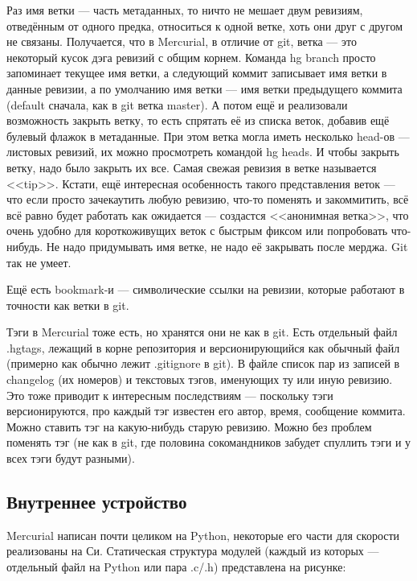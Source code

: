 \documentclass{../../text-style}
\begin{document}
Раз имя ветки --- часть метаданных, то ничто не мешает двум ревизиям, отведённым от одного предка, относиться к одной ветке, хоть они друг с другом не связаны. Получается, что в Mercurial, в отличие от git, ветка --- это некоторый кусок дэга ревизий с общим корнем. Команда hg branch просто запоминает текущее имя ветки, а следующий коммит записывает имя ветки в данные ревизии, а по умолчанию имя ветки --- имя ветки предыдущего коммита (default сначала, как в git ветка master). А потом ещё и реализовали возможность закрыть ветку, то есть спрятать её из списка веток, добавив ещё булевый флажок в метаданные. При этом ветка могла иметь несколько head-ов --- листовых ревизий, их можно просмотреть командой hg heads. И чтобы закрыть ветку, надо было закрыть их все. Самая свежая ревизия в ветке называется <<tip>>. Кстати, ещё интересная особенность такого представления веток --- что если просто зачекаутить любую ревизию, что-то поменять и закоммитить, всё всё равно будет работать как ожидается --- создастся <<анонимная ветка>>, что очень удобно для короткоживущих веток с быстрым фиксом или попробовать что-нибудь. Не надо придумывать имя ветке, не надо её закрывать после мерджа. Git так не умеет.

Ещё есть bookmark-и --- символические ссылки на ревизии, которые работают в точности как ветки в git.

Тэги в Mercurial тоже есть, но хранятся они не как в git. Есть отдельный файл .hgtags, лежащий в корне репозитория и версионирующийся как обычный файл (примерно как обычно лежит .gitignore в git). В файле список пар из записей в changelog (их номеров) и текстовых тэгов, именующих ту или иную ревизию. Это тоже приводит к интересным последствиям --- поскольку тэги версионируются, про каждый тэг известен его автор, время, сообщение коммита. Можно ставить тэг на какую-нибудь старую ревизию. Можно без проблем поменять тэг (не как в git, где половина сокомандников забудет спуллить тэги и у всех тэги будут разными).

\subsection{Внутреннее устройство}

Mercurial написан почти целиком на Python, некоторые его части для скорости реализованы на Си. Статическая структура модулей (каждый из которых --- отдельный файл на Python или пара .c/.h) представлена на рисунке:
\end{document}
